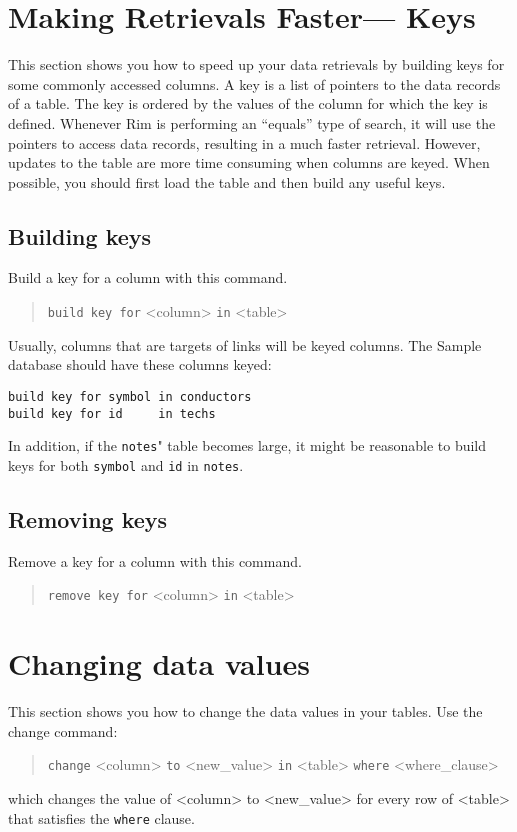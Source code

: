 \documentclass[11pt,a4paper]{report}
\begin{document}
\section{Making Retrievals Faster--- Keys}
%
This section shows you how to speed up your data retrievals
by building keys for some commonly accessed columns.
A key is a list of pointers to the data records
of a table. The key is ordered by the values of the column
for which the key is defined.
Whenever Rim is performing an ``equals'' type of search,
it will use the pointers to access data records, resulting in
a much faster retrieval.
However, updates to the table are more time consuming when
columns are keyed.  When possible, you should first load
the table and then build any useful keys.
 
\subsection{Building keys}
%
Build a key for a column with this command.
\begin{verse}
\verb!build key for! <column> \verb!in! <table>
\end{verse}
Usually, columns that are targets of links will be
keyed columns.
The Sample database should have these columns keyed:
\begin{verbatim}
build key for symbol in conductors
build key for id     in techs
\end{verbatim}

In addition,
if the \verb!notes!" table becomes large, it might be reasonable
to build keys for both \verb!symbol! and \verb!id! in \verb!notes!.
 
\subsection{Removing keys}
%
Remove a key for a column with this command.
\begin{verse}
  \verb!remove key for! <column> \verb!in! <table>
\end{verse}
 
\section{Changing data values}
%
This section shows you how to change the data values in your tables.
Use the change command:
\begin{verse}
\verb!change! <column> \verb!to! <new\_value> \verb!in! <table>
    \qquad  \verb!where! <where\_clause>
\end{verse}
which changes the value of <column> to <new\_value> for every
row of <table> that satisfies the \verb!where! clause.
 
\end{document}
